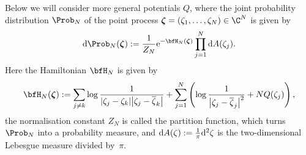 Below we will consider more general potentials $Q$, where the joint probability distribution $\Prob_N$ of the point process $\boldsymbol{\zeta}=(\zeta_1,\dots,\zeta_N) \in \C^N$ is given by
\begin{gather}\label{Gibbs}
	{\rm d} \Prob _N(\boldsymbol{\zeta}):= \frac{1}{Z_N} {\rm e}^{-\bfH_N( \boldsymbol{\zeta} )} \prod_{j=1}^N {\rm d}A(\zeta_j).
\end{gather}
Here the Hamiltonian $\bfH_N$ is given by
\begin{gather} \label{Ham}
	\bfH_N( \boldsymbol{\zeta} ):=\sum_{j\neq k} \log \frac{1}{|\zeta_j-\zeta_k| \big|\zeta_j-\overline{\zeta}_k\big| }+\sum_{j=1}^{N} \left( \log \frac{1}{\big| \zeta_j- \overline{\zeta}_j \big|^2}+ NQ(\zeta_j) \right),
\end{gather}
the normalisation constant $Z_N$ is called the partition function, which turns $\Prob _N$ into a probability measure, and ${\rm d}A(\zeta):=\tfrac{1}{\pi}{\rm d}^2\zeta$ is the two-dimensional Lebesgue measure divided by~$\pi$.

